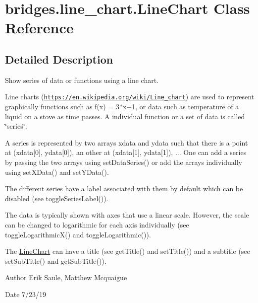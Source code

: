 \hypertarget{classbridges_1_1line__chart_1_1_line_chart}{}\section{bridges.\+line\+\_\+chart.\+Line\+Chart Class Reference}
\label{classbridges_1_1line__chart_1_1_line_chart}


\subsection{Detailed Description}
Show series of data or functions using a line chart. 

Line charts (\href{https://en.wikipedia.org/wiki/Line_chart}{\tt https\+://en.\+wikipedia.\+org/wiki/\+Line\+\_\+chart}) are used to represent graphically functions such as f(x) = 3$\ast$x+1, or data such as temperature of a liquid on a stove as time passes. A individual function or a set of data is called \char`\"{}series\char`\"{}.

A series is represented by two arrays xdata and ydata such that there is a point at (xdata\mbox{[}0\mbox{]}, ydata\mbox{[}0\mbox{]}), an other at (xdata\mbox{[}1\mbox{]}, ydata\mbox{[}1\mbox{]}), ... One can add a series by passing the two arrays using set\+Data\+Series() or add the arrays individually using set\+X\+Data() and set\+Y\+Data().

The different series have a label associated with them by default which can be disabled (see toggle\+Series\+Label()).

The data is typically shown with axes that use a linear scale. However, the scale can be changed to logarithmic for each axis individually (see toggle\+Logarithmic\+X() and toggle\+Logarithmic()).

The \mbox{\hyperlink{classbridges_1_1line__chart_1_1_line_chart}{Line\+Chart}} can have a title (see get\+Title() and set\+Title()) and a subtitle (see set\+Sub\+Title() and get\+Sub\+Title()).

\begin{DoxyAuthor}{Author}
Erik Saule, Matthew Mcquaigue
\end{DoxyAuthor}
\begin{DoxyDate}{Date}
7/23/19 
\end{DoxyDate}
